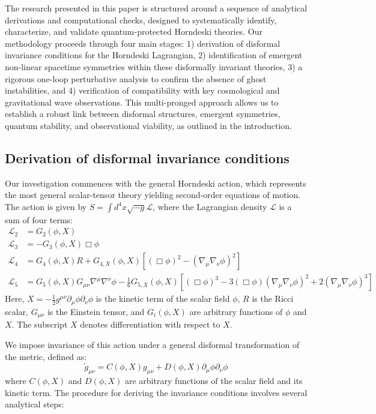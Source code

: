 \documentclass[twocolumn]{aastex631}
\begin{document}
The research presented in this paper is structured around a sequence of analytical derivations and computational checks, designed to systematically identify, characterize, and validate quantum-protected Horndeski theories. Our methodology proceeds through four main stages: 1) derivation of disformal invariance conditions for the Horndeski Lagrangian, 2) identification of emergent non-linear spacetime symmetries within these disformally invariant theories, 3) a rigorous one-loop perturbative analysis to confirm the absence of ghost instabilities, and 4) verification of compatibility with key cosmological and gravitational wave observations. This multi-pronged approach allows us to establish a robust link between disformal structures, emergent symmetries, quantum stability, and observational viability, as outlined in the introduction.

\subsection{Derivation of disformal invariance conditions}
Our investigation commences with the general Horndeski action, which represents the most general scalar-tensor theory yielding second-order equations of motion. The action is given by $S = \int d^4x \sqrt{-g} \mathcal{L}$, where the Lagrangian density $\mathcal{L}$ is a sum of four terms:
\begin{align*}
\mathcal{L}_2 &= G_2(\phi, X) \\
\mathcal{L}_3 &= -G_3(\phi, X) \Box\phi \\
\mathcal{L}_4 &= G_4(\phi, X) R + G_{4,X}(\phi, X) [(\Box\phi)^2 - (\nabla_\mu\nabla_\nu\phi)^2] \\
\mathcal{L}_5 &= G_5(\phi, X) G_{\mu\nu} \nabla^\mu\nabla^\nu\phi - \frac{1}{6} G_{5,X}(\phi, X) [(\Box\phi)^3 - 3(\Box\phi)(\nabla_\mu\nabla_\nu\phi)^2 + 2(\nabla_\mu\nabla_\nu\phi)^3]
\end{align*}
Here, $X = -\frac{1}{2}g^{\mu\nu}\partial_\mu\phi\partial_\nu\phi$ is the kinetic term of the scalar field $\phi$, $R$ is the Ricci scalar, $G_{\mu\nu}$ is the Einstein tensor, and $G_i(\phi, X)$ are arbitrary functions of $\phi$ and $X$. The subscript $X$ denotes differentiation with respect to $X$.

We impose invariance of this action under a general disformal transformation of the metric, defined as:
$$ \tilde{g}_{\mu\nu} = C(\phi, X) g_{\mu\nu} + D(\phi, X) \partial_\mu \phi \partial_\nu \phi $$
where $C(\phi, X)$ and $D(\phi, X)$ are arbitrary functions of the scalar field and its kinetic term. The procedure for deriving the invariance conditions involves several analytical steps:
\end{document}

